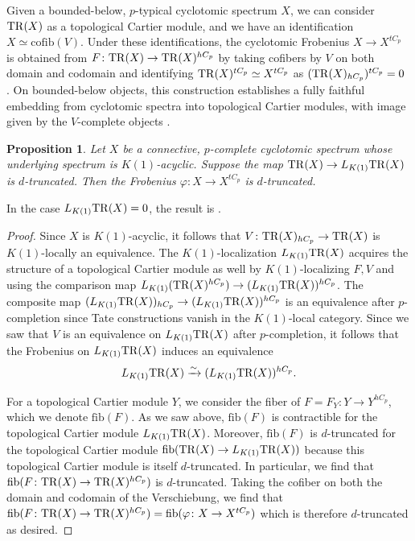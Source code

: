 \documentclass{amsart}
\newtheorem{proposition}[theorem]{Proposition}
\theoremstyle{definition}
\begin{document}
Given a
bounded-below, $p$-typical cyclotomic spectrum $X$, we can  consider $\mathrm{TR}(X)$ as
a topological Cartier module, and we have an identification $X \simeq \mathrm{cofib}(V)$. 
Under these identifications, the cyclotomic Frobenius $X \to X^{tC_p}$ is obtained from 
$F\colon  \mathrm{TR}(X) \to \mathrm{TR}(X)^{hC_p}$ by taking cofibers by $V$ on both domain and
codomain and identifying $\mathrm{TR}(X)^{tC_p} \simeq X^{tC_p}$ as
$(\mathrm{TR}(X)_{h{C_p}})^{tC_p}
= 0$ \cite[Lem.~I.2.1]{NS18}. 
On bounded-below objects, this construction establishes a fully faithful 
embedding from cyclotomic spectra into topological Cartier modules, with image
given by the $V$-complete objects \cite[Th.~3.21]{AN}. 

\begin{proposition} 
\label{trunctosegal}
Let $X$ be a connective,  $p$-complete cyclotomic spectrum whose underlying
spectrum is $K(1)$-acyclic. 
Suppose the map $\mathrm{TR}(X) \to L_{K(1)} \mathrm{TR}(X) $ is $d$-truncated. Then the Frobenius
$\varphi\colon  X \to X^{tC_p}$ is $d$-truncated. 
\end{proposition} 
In the case $L_{K(1)} \mathrm{TR}(X) =0$, the result is \cite[Prop.~2.25]{AN}. 

\begin{proof} 
Since $X$ is $K(1)$-acyclic, it follows that 
$V\colon  \mathrm{TR}( X)_{hC_p} \to \mathrm{TR}(X)$ is $K(1)$-locally an equivalence. 
The $K(1)$-localization 
$L_{K(1)} \mathrm{TR}(X)$ acquires the structure of a topological Cartier
module as well by $K(1)$-localizing $F, V$ and using the comparison map 
$L_{K(1)} ( \mathrm{TR}(X)^{hC_p}) \to (L_{K(1)} \mathrm{TR}(X))^{hC_p}$. 
The composite map 
$(L_{K(1)} \mathrm{TR}(X))_{hC_p} \to (L_{K(1)} \mathrm{TR}(X))^{hC_p}$ is an equivalence
after $p$-completion since
Tate constructions vanish in the $K(1)$-local category. Since we saw that $V$
is an equivalence on $L_{K(1)} \mathrm{TR}(X)$ after $p$-completion, it follows that 
the Frobenius on $L_{K(1)} \mathrm{TR}(X)$
induces an equivalence
$$L_{K(1)} \mathrm{TR}( X) \xrightarrow{\sim} (L_{K(1)} \mathrm{TR}(X))^{hC_p}.$$

For a topological Cartier module $Y$, we consider the fiber of $F  = F_Y\colon  Y \to Y^{hC_p}$,
which we denote $\mathrm{fib}(F)$. 
As we saw above, $\mathrm{fib}(F)$ is contractible for the 
topological Cartier module $L_{K(1)} \mathrm{TR}(X)$. 
Moreover, $\mathrm{fib}(F)$ is $d$-truncated for the topological Cartier module
$\mathrm{fib}( \mathrm{TR}(X) \to L_{K(1)} \mathrm{TR}(X))$ because this topological Cartier
module is itself $d$-truncated. 
In particular, we find that 
$\mathrm{fib}(F\colon \mathrm{TR}(X) \to \mathrm{TR}(X)^{hC_p})$ is $d$-truncated. 
Taking the cofiber on both the domain and codomain of the Verschiebung, we find
that 
$\mathrm{fib}(F\colon  \mathrm{TR}(X) \to \mathrm{TR}(X)^{hC_p}) = \mathrm{fib}(\varphi\colon  X \to X^{tC_p})$
which is therefore $d$-truncated as desired. 
\end{proof} 
\end{document}
